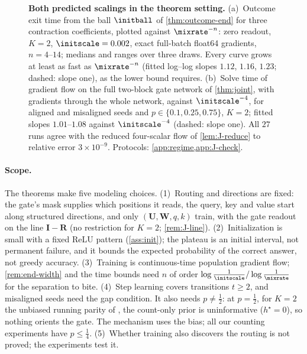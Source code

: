 \begin{figure}[t]
\centering
\resizebox{\linewidth}{!}{}
\caption{\textbf{Both predicted scalings in the theorem setting.}
(a)~Outcome exit time from the ball $\initball$ of \cref{thm:outcome-end} for three contraction coefficients, plotted against $\mixrate^{-n}$:
zero readout, $K=2$, $\initscale=0.002$, exact full-batch float64 gradients, $n=4$--$14$; medians and ranges over three draws. Every curve grows at least as fast as $\mixrate^{-n}$
(fitted log--log slopes $1.12$, $1.16$, $1.23$; dashed: slope one), as the lower bound requires. (b)~Solve time of gradient flow on the full two-block gate network of \cref{thm:joint}, with gradients through the whole network,
against $\initscale^{-4}$, for aligned and misaligned seeds and $p\in\{0.1,0.25,0.75\}$, $K=2$; fitted slopes $1.01$--$1.08$ against $\initscale^{-4}$ (dashed: slope one). All $27$ runs
agree with the reduced four-scalar flow of \cref{lem:J-reduce} to relative error $3\times10^{-9}$.
Protocols: \cref{app:regime,app:J-check}.}
\label{fig:scaling}
\end{figure}

\noindent{}

\paragraph{Scope.} The theorems make five modeling choices. (1)~Routing and directions are fixed: the gate's mask supplies which positions
it reads, the query, key and value start along structured directions, and only $(\mathbf U,\mathbf W,q,k)$ train, with the gate readout on
the line $\mathbf I-\mathbf R$ (no restriction for $K=2$; \cref{rem:J-line}). (2)~Initialization is small with a fixed ReLU pattern
(\cref{ass:init}); the plateau is an initial interval, not permanent failure, and it bounds the expected probability of the correct
answer, not greedy accuracy. (3)~Training is continuous-time population gradient flow; \cref{rem:end-width} and the time bounds need
$n$ of order $\log\frac1\initscale/\log\frac1\mixrate$ for the separation to bite. (4)~Step learning covers transitions $t\ge2$, and misaligned seeds need the gap condition. It also needs $p\ne\frac12$: at $p=\frac12$,
for $K=2$ the unbiased running parity of \citet{kim2024parity}, the count-only prior is uninformative ($h^\star=0$), so nothing orients the
gate. The mechanism uses the bias; all our counting experiments have $p\le\frac14$. (5)~Whether training also discovers the routing is not proved; the
experiments test it.

